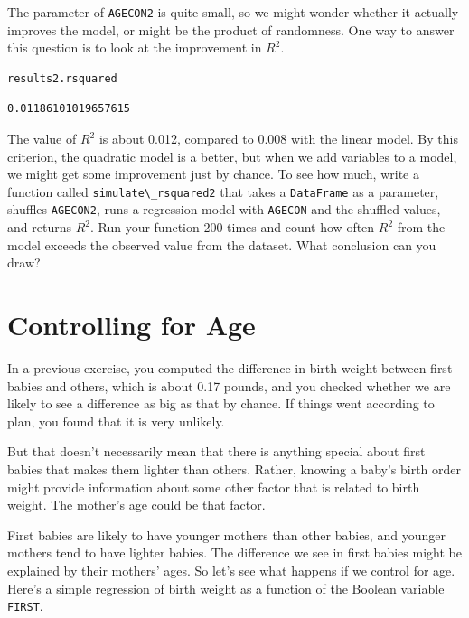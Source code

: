 The parameter of \passthrough{\lstinline!AGECON2!} is quite small, so we
might wonder whether it actually improves the model, or might be the
product of randomness. One way to answer this question is to look at the
improvement in \(R^2\).

\begin{lstlisting}[language=Python,style=source]
results2.rsquared
\end{lstlisting}

\begin{lstlisting}[style=output]
0.01186101019657615
\end{lstlisting}

The value of \(R^2\) is about 0.012, compared to 0.008 with the linear
model. By this criterion, the quadratic model is a better, but when we
add variables to a model, we might get some improvement just by chance.
To see how much, write a function called
\passthrough{\lstinline!simulate\_rsquared2!} that takes a
\passthrough{\lstinline!DataFrame!} as a parameter, shuffles
\passthrough{\lstinline!AGECON2!}, runs a regression model with
\passthrough{\lstinline!AGECON!} and the shuffled values, and returns
\(R^2\). Run your function 200 times and count how often \(R^2\) from
the model exceeds the observed value from the dataset. What conclusion
can you draw?

\hypertarget{controlling-for-age}{%
\section{Controlling for Age}\label{controlling-for-age}}

In a previous exercise, you computed the difference in birth weight
between first babies and others, which is about 0.17 pounds, and you
checked whether we are likely to see a difference as big as that by
chance. If things went according to plan, you found that it is very
unlikely.

But that doesn't necessarily mean that there is anything special about
first babies that makes them lighter than others. Rather, knowing a
baby's birth order might provide information about some other factor
that is related to birth weight. The mother's age could be that factor.

First babies are likely to have younger mothers than other babies, and
younger mothers tend to have lighter babies. The difference we see in
first babies might be explained by their mothers' ages. So let's see
what happens if we control for age. Here's a simple regression of birth
weight as a function of the Boolean variable
\passthrough{\lstinline!FIRST!}.


